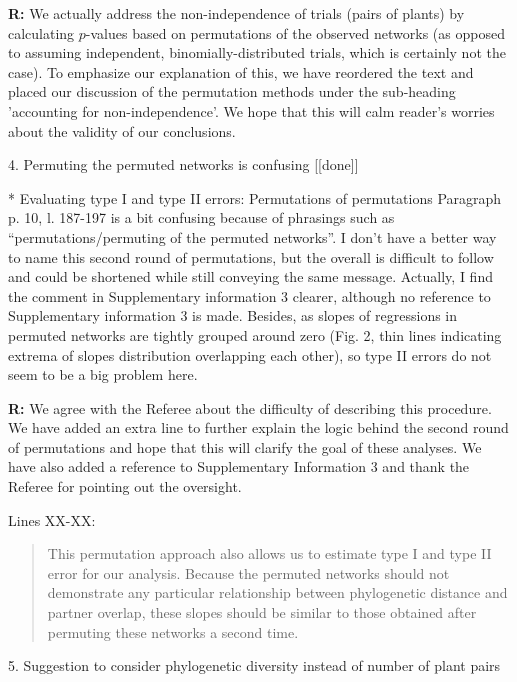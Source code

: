 \documentclass[12pt]{letter}
\newenvironment{refquote}{\bigskip \begin{it}}{\end{it}\smallskip}
\begin{document}
	\textbf{R:} We actually address the non-independence of trials (pairs of plants) by calculating $p$-values based on permutations of the observed networks (as opposed to assuming independent, binomially-distributed trials, which is certainly not the case). To emphasize our explanation of this, we have reordered the text and placed our discussion of the permutation methods under the sub-heading 'accounting for non-independence'. We hope that this will calm reader's worries about the validity of our conclusions.


4. Permuting the permuted networks is confusing [[done]]

	\begin{refquote}
		* Evaluating type I and type II errors: Permutations of permutations
		Paragraph p. 10, l. 187-197 is a bit confusing because of phrasings such as “permutations/permuting of the permuted networks”. I don't have a better way to name this second round of permutations, but the overall is difficult to follow and could be shortened while still conveying the same message.
		Actually, I find the comment in Supplementary information 3 clearer, although no reference to Supplementary information 3 is made.
		Besides, as slopes of regressions in permuted networks are tightly grouped around zero (Fig. 2, thin lines indicating 
		extrema of slopes distribution overlapping each other), so type II errors do not seem to be a big problem here.
	\end{refquote}


	\textbf{R:} We agree with the Referee about the difficulty of describing this procedure. We have added an extra line to further explain the logic behind the second round of permutations and hope that this will clarify the goal of these analyses. We have also added a reference to Supplementary Information 3 and thank the Referee for pointing out the oversight.


	Lines XX-XX:

	\begin{quotation}
		This permutation approach also allows us to estimate type I and type II 
	    error for our analysis. Because the permuted networks should not demonstrate any particular relationship between phylogenetic distance and partner overlap, these slopes should be similar to those obtained after permuting these networks a second time.
	\end{quotation}


5. Suggestion to consider phylogenetic diversity instead of number of plant pairs
\end{document}
